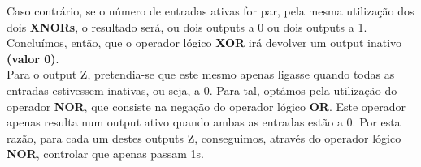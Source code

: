 \documentclass[12pt]{article}
\begin{document}
Caso contrário, se o número de entradas ativas for par, pela mesma utilização dos dois \textbf{XNORs}, o resultado será, ou dois outputs a 0 ou dois outputs a 1. Concluímos, então, que o operador lógico \textbf{XOR} irá devolver um output inativo \textbf{(valor 0)}.\\

Para o output Z, pretendia-se que este mesmo apenas ligasse quando todas as entradas estivessem inativas, ou seja, a 0.
Para tal, optámos pela utilização do operador \textbf{NOR}, que consiste na negação do operador lógico \textbf{OR}. Este operador apenas resulta num output ativo quando ambas as entradas estão a 0. Por esta razão, para cada um destes outputs Z, conseguimos, através do operador lógico \textbf{NOR}, controlar que apenas passam 1s.\\
\end{document}
